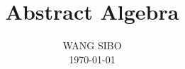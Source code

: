 

\setcounter{chapter}{-1}



\frontmatter

\makeatletter

\makeatother

\title{Abstract Algebra}
\author{WANG SIBO\\ \today}

\maketitle

\tableofcontents

\mainmatter



%
%



